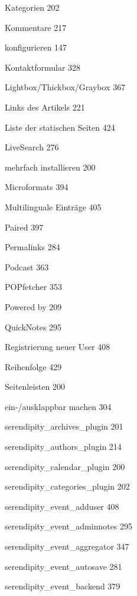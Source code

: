 \documentclass{book}
\renewcommand\subitem{\par}
\renewcommand\subsubitem{\par\hspace*{3mm}}
\begin{document}
\begin{multicols}{2}
\begin{osp-index}
    \subitem Kategorien\hspace{1mm} 202
    \subitem Kommentare\hspace{1mm} 217
    \subitem konfigurieren\hspace{1mm} 147
    \subitem Kontaktformular\hspace{1mm} 328
    \subitem Lightbox/Thickbox/Graybox\hspace{1mm} 367
    \subitem Links des Artikels\hspace{1mm} 221
    \subitem Liste der statischen Seiten\hspace{1mm} 424
    \subitem LiveSearch\hspace{1mm} 276
    \subitem mehrfach installieren\hspace{1mm} 200
    \subitem Microformats\hspace{1mm} 394
    \subitem Multilinguale Eintr\"age\hspace{1mm} 405
    \subitem Paired\hspace{1mm} 397
    \subitem Permalinks\hspace{1mm} 284
    \subitem Podcast\hspace{1mm} 363
    \subitem POPfetcher\hspace{1mm} 353
    \subitem Powered by\hspace{1mm} 209
    \subitem QuickNotes\hspace{1mm} 295
    \subitem Registrierung neuer User\hspace{1mm} 408
    \subitem Reihenfolge\hspace{1mm} 429
    \subitem Seitenleisten\hspace{1mm} 200
      \subsubitem ein-/ausklappbar machen\hspace{1mm} 304
    \subitem serendipity\_archives\_plugin\hspace{1mm} 201
    \subitem serendipity\_authors\_plugin\hspace{1mm} 214
    \subitem serendipity\_calendar\_plugin\hspace{1mm} 200
    \subitem serendipity\_categories\_plugin\hspace{1mm} 202
    \subitem serendipity\_event\_adduser\hspace{1mm} 408
    \subitem serendipity\_event\_adminnotes\hspace{1mm} 295
    \subitem serendipity\_event\_aggregator\hspace{1mm} 347
    \subitem serendipity\_event\_autosave\hspace{1mm} 281
    \subitem serendipity\_event\_backend\hspace{1mm} 379

\end{osp-index}
\end{multicols}
\end{document}
